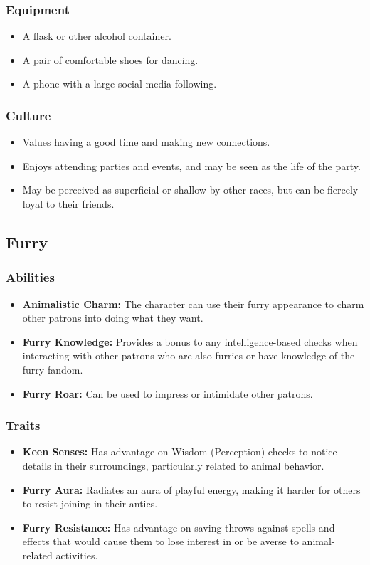 \documentclass{book}
\begin{document}
\subsubsection{Equipment}
\begin{itemize}
    \item A flask or other alcohol container.
    \item A pair of comfortable shoes for dancing.
    \item A phone with a large social media following.
\end{itemize}
\subsubsection{Culture}
\begin{itemize}
    \item Values having a good time and making new connections.
    \item Enjoys attending parties and events, and may be seen as the life of the party.
    \item May be perceived as superficial or shallow by other races, but can be fiercely loyal to their friends.
\end{itemize}

\subsection{Furry}
\subsubsection{Abilities}
\begin{itemize}
    \item \textbf{Animalistic Charm:} The character can use their furry appearance to charm other patrons into doing what they want.
    \item \textbf{Furry Knowledge:} Provides a bonus to any intelligence-based checks when interacting with other patrons who are also furries or have knowledge of the furry fandom.
    \item \textbf{Furry Roar:} Can be used to impress or intimidate other patrons.
\end{itemize}
\subsubsection{Traits}
\begin{itemize}
    \item \textbf{Keen Senses:} Has advantage on Wisdom (Perception) checks to notice details in their surroundings, particularly related to animal behavior.
    \item \textbf{Furry Aura:} Radiates an aura of playful energy, making it harder for others to resist joining in their antics.
    \item \textbf{Furry Resistance:} Has advantage on saving throws against spells and effects that would cause them to lose interest in or be averse to animal-related activities.
\end{itemize}
\end{document}
